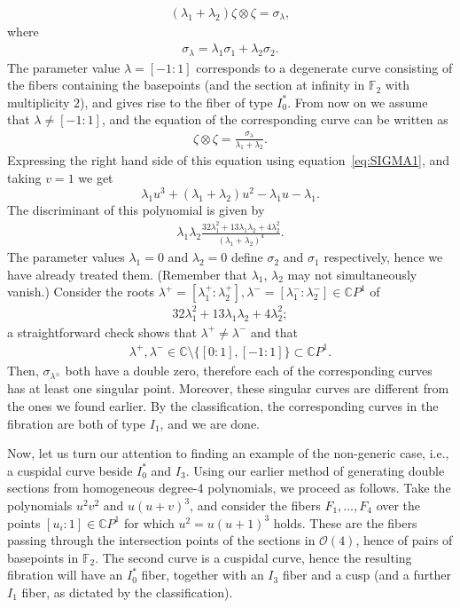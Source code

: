 \documentclass[10pt,a4paper]{amsart}
\newcommand{\C}{{\mathbb C}} %
\newcommand{\CP}[1]{\mathbb{C}P^{#1}} %
\numberwithin{equation}{section}
\begin{document}
\begin{Example}
\begin{gather*}
 (\lambda_1 + \lambda_2) \zeta \otimes \zeta = \sigma_{\lambda},
\end{gather*}
where
\begin{gather*}
 \sigma_{\lambda} = \lambda_1 \sigma_1 + \lambda_2 \sigma_2.
\end{gather*}
The parameter value $\lambda = [-1:1]$ corresponds to a degenerate
 curve consisting of the fibers containing the basepoints (and the
 section at infinity in ${\mathbb {F}}_2$ with multiplicity $2$), and
 gives rise to the fiber of type $I_0^*$. From now on we assume that
 $\lambda \neq [-1:1]$, and the equation of the corresponding curve
 can be written as
\begin{gather*}
 \zeta \otimes \zeta = \frac{\sigma_{\lambda}}{\lambda_1 + \lambda_2}.
\end{gather*}
Expressing the right hand side of this equation using equation~\eqref{eq:SIGMA1},
and taking $v=1$ we get
\[
\lambda _1u^3+(\lambda _1+\lambda _2)u^2-\lambda _1u-\lambda _1.
\]
The discriminant of this polynomial is given by
\begin{gather*}
 \lambda_1 \lambda_2 \frac{32 \lambda_1^2 + 13 \lambda_1 \lambda_2 + 4 \lambda_2^2}{(\lambda_1 + \lambda_2)^4}.
\end{gather*}
The parameter values $\lambda_1 = 0$ and $\lambda_2 = 0$ define $\sigma_2$ and $\sigma_1$ respectively,
hence we have already treated them. (Remember that $\lambda_1$, $\lambda_2$ may not simultaneously vanish.)
Consider the roots $\lambda^+=[\lambda _1^+:\lambda _2^+], \lambda^- =[\lambda _1^-:\lambda _2^-] \in\CP1$ of
\begin{gather*}
 32 \lambda_1^2 + 13 \lambda_1 \lambda_2 + 4 \lambda_2^2;
\end{gather*}
a straightforward check shows that $\lambda^+ \neq \lambda^-$ and that
\begin{gather*}
 \lambda^+, \lambda^- \in\C\setminus \{ [0:1] , [-1:1] \}\subset\CP1.
\end{gather*} Then, $\sigma_{\lambda^{\pm}}$ both have a double zero, therefore
 each of the corresponding curves has at least one singular
 point. Moreover, these singular curves are different from the ones
 we found earlier. By the classification, the corresponding curves in
 the fibration are both of type $I_1$, and we are done.

Now, let us turn our attention to finding an example of the non-generic case,
i.e., a cuspidal curve beside $I_0^*$ and $I_3$.
Using our earlier method of generating double sections
from homogeneous degree-4 polynomials, we proceed as follows. Take the
polynomials $u^2v^2$ and $u(u+v)^3$, and consider the fibers $F_1,
\ldots , F_4$ over the points $[u_i:1]\in \CP{1}$ for which
$u^2=u(u+1)^3$ holds. These are the fibers passing through the
intersection points of the sections in ${\mathcal {O}}(4)$, hence of
pairs of basepoints in ${\mathbb {F}}_2$. The second curve is a
cuspidal curve, hence the resulting fibration will have an
$I_0^*$ fiber, together with an $I_3$ fiber and a cusp (and a further
$I_1$ fiber, as dictated by the classification).
\end{Example}
\end{document}
